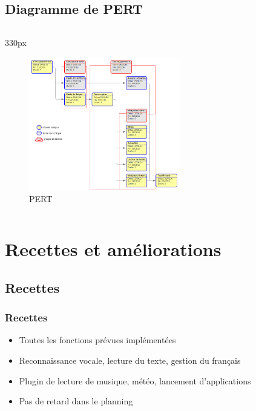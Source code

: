 \documentclass{beamer}
\begin{document}
\subsection{Diagramme de PERT}
{
\logo{}
\begin{frame}
\begin{center}
\begin{columns}
\begin{column}{330px}
{
    \vspace{-0.5em}
    \begin{figure}[h!]
        \centering
        \includegraphics[height=220px]
            {images/pert}
        \vspace{-1em}
        \caption{PERT}
    \end{figure}
}
\end{column}
\end{columns}
\end{center}
\end{frame}
}


\section{Recettes et améliorations}

\subsection{Recettes}
\begin{frame}
\frametitle{Recettes}
\begin{itemize}
    \setlength\itemsep{2em}
    \item Toutes les fonctions prévues implémentées
    \item Reconnaissance vocale, lecture du texte, gestion du français
    \item Plugin de lecture de musique, météo, lancement d'applications
    \item Pas de retard dans le planning
\end{itemize}
\end{frame}
\end{document}
